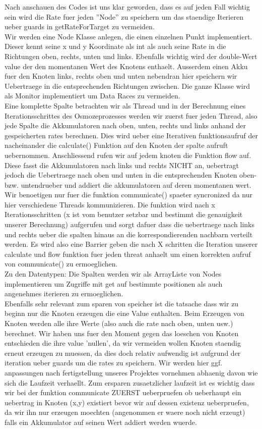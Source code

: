 \documentclass[12pt]{article}
\begin{document}
Nach anschauen des Codes ist uns klar geworden, dass es auf jeden Fall wichtig sein wird die Rate fuer jeden ''Node'' zu speichern um das staendige Iterieren ueber guards in getRateForTarget zu vermeiden.\\
Wir werden eine Node Klasse anlegen, die einen einzelnen Punkt implementiert. Dieser kennt seine x und y Koordinate als int als auch seine Rate in die Richtungen oben, rechts, unten und links. Ebenfalls wichtig wird der double-Wert value der den momentanen Wert des Knotens enthaelt. Ausserdem einen Akku fuer den Knoten links, rechts oben und unten nebendran hier speichern wir Uebertraege in die entsprechenden Richtungen zwischen. Die ganze Klasse wird als Monitor implementiert um Data Races zu vermeiden. \\
Eine komplette Spalte betrachten wir als Thread und in der Berechnung eines Iterationsschrittes des Osmozeprozesses werden wir zuerst fuer jeden Thread, also jede Spalte die Akkumulatoren nach oben, unten, rechts und links anhand der gespeicherten rates berechnen. Dies wird ueber eine Iterativen funktionsaufruf der nacheinander die calculate() Funktion auf den Knoten der spalte aufruft uebernommen. Anschliessend rufen wir auf jedem knoten die Funktion flow auf. Diese fasst die Akkumulatoren nach links und rechts NICHT an, uebertragt jedoch die Uebertraege nach oben und unten in die entsprechenden Knoten oben- bzw. untendrueber und addiert die akkumulatoren auf deren momentanen wert. Wir benoetigen nur fuer die funktion communicate() spaeter syncronized da nur hier verschiedene Threads kommunizieren. Die funktion wird nach x Iterationsschritten (x ist vom benutzer setzbar und bestimmt die genauigkeit unserer Berechnung) aufgerufen und sorgt dafuer dass die uebertraege nach links und rechts ueber die spalten hinaus an die korrespondierenden nachbarn verteilt werden. Es wird also eine Barrier geben die nach X schritten die Iteration unserer calculate und flow funktion fuer jeden threat anhaelt um einen korrekten aufruf von communicate() zu ermoeglichen.\\
Zu den Datentypen: Die Spalten werden wir als ArrayListe von Nodes implementieren um Zugriffe mit get auf bestimmte positionen als auch angenehmes iterieren zu ermoeglichen.\\
Ebenfalls sehr relevant zum sparen von speicher ist die tatsache dass wir zu beginn nur die Knoten erzeugen die eine Value enthalten. Beim Erzeugen von Knoten werden alle ihre Werte (also auch die rate nach oben, unten usw.) berechnet. Wir haben uns fuer den Moment gegen das loeschen von Knoten entschieden die ihre value 'nullen', da wir vermeiden wollen Knoten staendig erneut erzeugen zu muessen, da dies doch relativ aufwendig ist aufgrund der iteration ueber guards um die rates zu speichern. Wir werden hier ggf. anpassungen nach fertigstellung unseres Projektes vornehmen abhaenig davon wie sich die Laufzeit verhaellt. Zum ersparen zusaetzlicher laufzeit ist es wichtig dass wir bei der funktion communicate ZUERST ueberpruefen ob ueberhaupt ein uebertrag in Knoten (x,y) existiert bevor wir auf dessen existenz ueberpruefen, da wir ihn nur erzeugen moechten (angenommen er waere noch nicht erzeugt) falls ein Akkumulator auf seinen Wert addiert werden wuerde.\\
\end{document}
